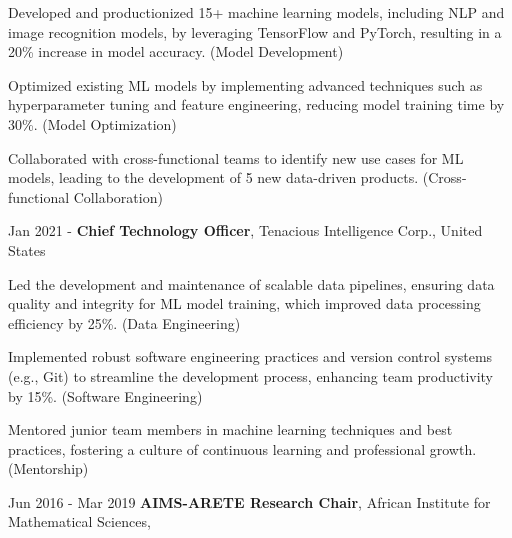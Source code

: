 \documentclass{modern} %
\begin{document}
    \vspace{0.10cm}
    \begin{onecolentry}
        \begin{highlights}
                            \item Developed and productionized 15+ machine learning models, including NLP and image recognition models, by leveraging TensorFlow and PyTorch, resulting in a 20\% increase in model accuracy. (Model Development) 
                            \item Optimized existing ML models by implementing advanced techniques such as hyperparameter tuning and feature engineering, reducing model training time by 30\%. (Model Optimization) 
                            \item Collaborated with cross{-}functional teams to identify new use cases for ML models, leading to the development of 5 new data{-}driven products. (Cross{-}functional Collaboration) 
                    \end{highlights}
    \end{onecolentry}

    \begin{twocolentry}{
        Jan 2021 -  
    }
        \textbf{Chief Technology Officer}, Tenacious Intelligence Corp., United States
    \end{twocolentry}

    \vspace{0.10cm}
    \begin{onecolentry}
        \begin{highlights}
                            \item Led the development and maintenance of scalable data pipelines, ensuring data quality and integrity for ML model training, which improved data processing efficiency by 25\%. (Data Engineering) 
                            \item Implemented robust software engineering practices and version control systems (e.g., Git) to streamline the development process, enhancing team productivity by 15\%. (Software Engineering) 
                            \item Mentored junior team members in machine learning techniques and best practices, fostering a culture of continuous learning and professional growth. (Mentorship) 
                    \end{highlights}
    \end{onecolentry}

    \begin{twocolentry}{
        Jun 2016 -  Mar 2019
    }
        \textbf{AIMS{-}ARETE Research Chair}, African Institute for Mathematical Sciences, 
    \end{twocolentry}
\end{document}
